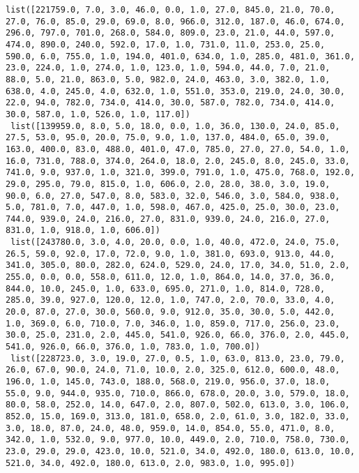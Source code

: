 \documentclass[11pt]{article}
\begin{document}
\begin{Verbatim}[commandchars=\\\{\}]
 list([221759.0, 7.0, 3.0, 46.0, 0.0, 1.0, 27.0, 845.0, 21.0, 70.0, 27.0, 76.0, 85.0, 29.0, 69.0, 8.0, 966.0, 312.0, 187.0, 46.0, 674.0, 296.0, 797.0, 701.0, 268.0, 584.0, 809.0, 23.0, 21.0, 44.0, 597.0, 474.0, 890.0, 240.0, 592.0, 17.0, 1.0, 731.0, 11.0, 253.0, 25.0, 590.0, 6.0, 755.0, 1.0, 194.0, 401.0, 634.0, 1.0, 285.0, 481.0, 361.0, 23.0, 224.0, 1.0, 274.0, 1.0, 123.0, 1.0, 594.0, 44.0, 7.0, 21.0, 88.0, 5.0, 21.0, 863.0, 5.0, 982.0, 24.0, 463.0, 3.0, 382.0, 1.0, 638.0, 4.0, 245.0, 4.0, 632.0, 1.0, 551.0, 353.0, 219.0, 24.0, 30.0, 22.0, 94.0, 782.0, 734.0, 414.0, 30.0, 587.0, 782.0, 734.0, 414.0, 30.0, 587.0, 1.0, 526.0, 1.0, 117.0])
 list([139959.0, 8.0, 5.0, 18.0, 0.0, 1.0, 36.0, 130.0, 24.0, 85.0, 27.5, 53.0, 95.0, 20.0, 75.0, 9.0, 1.0, 137.0, 484.0, 65.0, 39.0, 163.0, 400.0, 83.0, 488.0, 401.0, 47.0, 785.0, 27.0, 27.0, 54.0, 1.0, 16.0, 731.0, 788.0, 374.0, 264.0, 18.0, 2.0, 245.0, 8.0, 245.0, 33.0, 741.0, 9.0, 937.0, 1.0, 321.0, 399.0, 791.0, 1.0, 475.0, 768.0, 192.0, 29.0, 295.0, 79.0, 815.0, 1.0, 606.0, 2.0, 28.0, 38.0, 3.0, 19.0, 90.0, 6.0, 27.0, 547.0, 8.0, 583.0, 32.0, 546.0, 3.0, 584.0, 938.0, 5.0, 781.0, 7.0, 447.0, 1.0, 598.0, 467.0, 425.0, 25.0, 30.0, 23.0, 744.0, 939.0, 24.0, 216.0, 27.0, 831.0, 939.0, 24.0, 216.0, 27.0, 831.0, 1.0, 918.0, 1.0, 606.0])
 list([243780.0, 3.0, 4.0, 20.0, 0.0, 1.0, 40.0, 472.0, 24.0, 75.0, 26.5, 59.0, 92.0, 17.0, 72.0, 9.0, 1.0, 381.0, 693.0, 913.0, 44.0, 341.0, 305.0, 80.0, 282.0, 624.0, 529.0, 24.0, 17.0, 34.0, 51.0, 2.0, 255.0, 0.0, 0.0, 558.0, 611.0, 12.0, 1.0, 864.0, 14.0, 37.0, 36.0, 844.0, 10.0, 245.0, 1.0, 633.0, 695.0, 271.0, 1.0, 814.0, 728.0, 285.0, 39.0, 927.0, 120.0, 12.0, 1.0, 747.0, 2.0, 70.0, 33.0, 4.0, 20.0, 87.0, 27.0, 30.0, 560.0, 9.0, 912.0, 35.0, 30.0, 5.0, 442.0, 1.0, 369.0, 6.0, 710.0, 7.0, 346.0, 1.0, 859.0, 717.0, 256.0, 23.0, 30.0, 25.0, 231.0, 2.0, 445.0, 541.0, 926.0, 66.0, 376.0, 2.0, 445.0, 541.0, 926.0, 66.0, 376.0, 1.0, 783.0, 1.0, 700.0])
 list([228723.0, 3.0, 19.0, 27.0, 0.5, 1.0, 63.0, 813.0, 23.0, 79.0, 26.0, 67.0, 90.0, 24.0, 71.0, 10.0, 2.0, 325.0, 612.0, 600.0, 48.0, 196.0, 1.0, 145.0, 743.0, 188.0, 568.0, 219.0, 956.0, 37.0, 18.0, 55.0, 9.0, 944.0, 935.0, 710.0, 866.0, 678.0, 20.0, 3.0, 579.0, 18.0, 80.0, 58.0, 252.0, 14.0, 647.0, 2.0, 807.0, 502.0, 613.0, 3.0, 106.0, 852.0, 15.0, 169.0, 313.0, 181.0, 658.0, 2.0, 61.0, 3.0, 182.0, 33.0, 3.0, 18.0, 87.0, 24.0, 48.0, 959.0, 14.0, 854.0, 55.0, 471.0, 8.0, 342.0, 1.0, 532.0, 9.0, 977.0, 10.0, 449.0, 2.0, 710.0, 758.0, 730.0, 23.0, 29.0, 29.0, 423.0, 10.0, 521.0, 34.0, 492.0, 180.0, 613.0, 10.0, 521.0, 34.0, 492.0, 180.0, 613.0, 2.0, 983.0, 1.0, 995.0])

\end{Verbatim}
\end{document}
